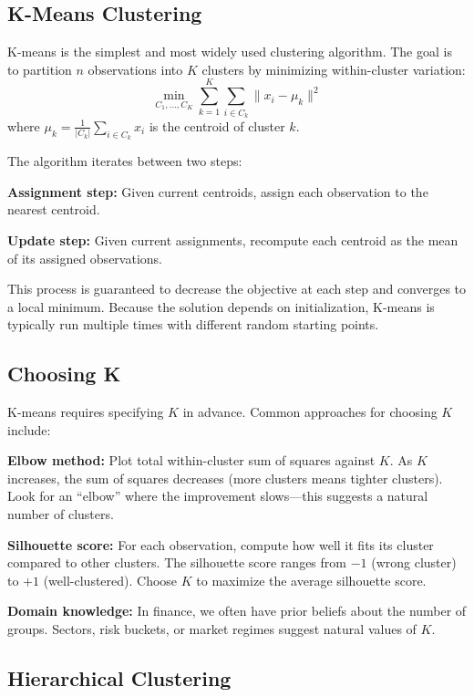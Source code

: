 \documentclass[11pt,a4paper]{article}
\begin{document}
\subsection{K-Means Clustering}

K-means is the simplest and most widely used clustering algorithm. The goal is to partition $n$ observations into $K$ clusters by minimizing within-cluster variation:
\[
\min_{C_1, \ldots, C_K} \sum_{k=1}^{K} \sum_{i \in C_k} \|x_i - \mu_k\|^2
\]
where $\mu_k = \frac{1}{|C_k|} \sum_{i \in C_k} x_i$ is the centroid of cluster $k$.

The algorithm iterates between two steps:

\textbf{Assignment step:} Given current centroids, assign each observation to the nearest centroid.

\textbf{Update step:} Given current assignments, recompute each centroid as the mean of its assigned observations.

This process is guaranteed to decrease the objective at each step and converges to a local minimum. Because the solution depends on initialization, K-means is typically run multiple times with different random starting points.

\subsection{Choosing K}

K-means requires specifying $K$ in advance. Common approaches for choosing $K$ include:

\textbf{Elbow method:} Plot total within-cluster sum of squares against $K$. As $K$ increases, the sum of squares decreases (more clusters means tighter clusters). Look for an ``elbow'' where the improvement slows---this suggests a natural number of clusters.

\textbf{Silhouette score:} For each observation, compute how well it fits its cluster compared to other clusters. The silhouette score ranges from $-1$ (wrong cluster) to $+1$ (well-clustered). Choose $K$ to maximize the average silhouette score.

\textbf{Domain knowledge:} In finance, we often have prior beliefs about the number of groups. Sectors, risk buckets, or market regimes suggest natural values of $K$.

\subsection{Hierarchical Clustering}
\end{document}
